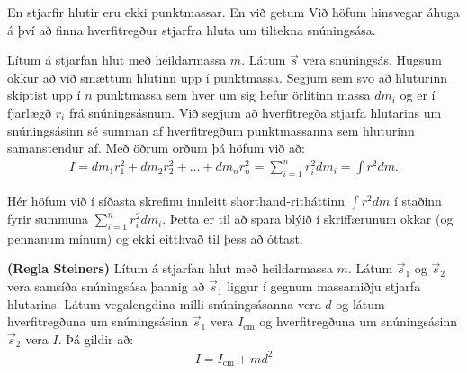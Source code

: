 \ifdefined \wholebook \else\documentclass[oneside]{book}\usepackage{EdlBook}\graphicspath{{figures/}}
\begin{document}
\newpage

En stjarfir hlutir eru ekki punktmassar. En við getum 
Við höfum hinsvegar áhuga á því að finna hverfitregður stjarfra hluta um tiltekna snúningsása.

\begin{tcolorbox}
\begin{definition}
Lítum á stjarfan hlut með heildarmassa $m$. Látum $\vec{s}$ vera snúningsás. Hugsum okkur að við smættum hlutinn upp í punktmassa. Segjum sem svo að hluturinn skiptist upp í $n$ punktmassa sem hver um sig hefur örlítinn massa $dm_i$ og er í fjarlægð $r_i$ frá snúningsásnum. Við segjum að hverfitregða stjarfa hlutarins um snúningsásinn sé summan af hverfitregðum punktmassanna sem hluturinn samanstendur af. Með öðrum orðum þá höfum við að:
\begin{align*}
    I = dm_1r_1^2 + dm_2r_2^2 + \ldots + dm_n r_n^2 = \sum_{i=1}^{n} r_i^2 dm_i = \int r^2dm.
\end{align*}
\end{definition}
\end{tcolorbox}

Hér höfum við í síðasta skrefinu innleitt shorthand-ritháttinn $\int r^2dm$ í staðinn fyrir summuna $\sum\limits_{i=1}^{n}r_i^2dm_i$. Þetta er til að spara blýið í skriffærunum okkar (og pennanum mínum) og ekki eitthvað til þess að óttast.


\begin{tcolorbox}
\begin{theorem}
\textbf{(Regla Steiners)} Lítum á stjarfan hlut með heildarmassa $m$. Látum $\vec{s}_1$ og $\vec{s}_2$ vera samsíða snúningsása þannig að $\vec{s}_1$ liggur í gegnum massamiðju stjarfa hlutarins. Látum vegalengdina milli snúningsásanna vera $d$ og látum hverfitregðuna um snúningsásinn $\vec{s}_1$ vera $I_{\text{cm}}$ og hverfitregðuna um snúningsásinn $\vec{s}_2$ vera $I$. Þá gildir að:
\begin{align*}
    I = I_{\text{cm}} + md^2
\end{align*}
\end{theorem}
\end{tcolorbox}
\end{document}

